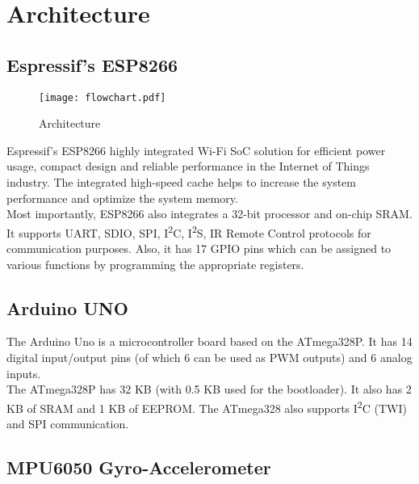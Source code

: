 \documentclass[./main.tex]{subfiles}
\begin{document}
\chapter{Architecture}
\section{Espressif's ESP8266}

\begin{figure}[H]
    \centering
    \texttt{[image: flowchart.pdf]}
    \caption{Architecture}
    \label{fig:architecture}
\end{figure}


Espressif’s ESP8266 highly integrated Wi-Fi SoC solution for efficient power usage, compact design and reliable performance in the Internet of Things industry. The integrated high-speed cache helps to increase the system performance and optimize the system memory. \\
Most importantly, ESP8266 also integrates a 32-bit processor and on-chip SRAM.
It supports UART, SDIO, SPI, I\textsuperscript{2}C, I\textsuperscript{2}S, IR Remote Control protocols for communication purposes.
Also, it has 17 GPIO pins which can be assigned to various functions by programming the appropriate registers.

\section{Arduino UNO}

The Arduino Uno is a microcontroller board based on the ATmega328P. It has 14 digital input/output pins (of which 6 can be used as PWM outputs) and 6 analog inputs. \\ The ATmega328P has 32 KB (with 0.5 KB used for the bootloader). It also has 2 KB of SRAM and 1 KB of EEPROM. The ATmega328 also supports I\textsuperscript{2}C (TWI) and SPI communication.

\section{MPU6050 Gyro-Accelerometer}
\end{document}
